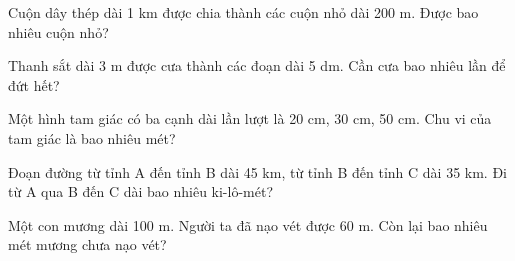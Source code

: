 \begin{ex} %
Cuộn dây thép dài 1 km được chia thành các cuộn nhỏ dài 200 m. Được bao nhiêu cuộn nhỏ?
\end{ex}

\begin{ex} %
Thanh sắt dài 3 m được cưa thành các đoạn dài 5 dm. Cần cưa bao nhiêu lần để đứt hết?
\end{ex}

\begin{ex} %
Một hình tam giác có ba cạnh dài lần lượt là 20 cm, 30 cm, 50 cm. Chu vi của tam giác là bao nhiêu mét?
\end{ex}

\begin{ex} %
Đoạn đường từ tỉnh A đến tỉnh B dài 45 km, từ tỉnh B đến tỉnh C dài 35 km. Đi từ A qua B đến C dài bao nhiêu ki-lô-mét?
\end{ex}

\begin{ex} %
Một con mương dài 100 m. Người ta đã nạo vét được 60 m. Còn lại bao nhiêu mét mương chưa nạo vét?
\end{ex}
